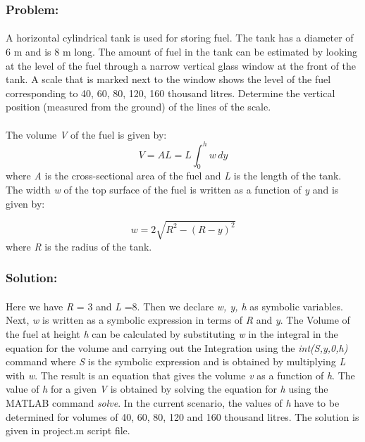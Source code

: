 \documentclass[]{article}
\begin{document}
\subsubsection{Problem:}
\paragraph{}
A horizontal cylindrical tank is used for storing fuel. The tank has a diameter of 6 m and is 8 m long. The amount of fuel in the tank can be estimated by looking at the level of the fuel through a narrow vertical glass window at the front of the tank. A scale that is marked next to the window shows the level of the fuel corresponding to 40, 60, 80, 120, 160 thousand litres. Determine the vertical position (measured from the ground) of the lines of the scale. 
\paragraph{}
The volume \emph{V} of the fuel is given by:
\[
V=AL=L\int_0^h w\, dy
\]
where \emph{A} is the cross-sectional area of the fuel and \emph{L} is the length of the tank. The width \emph{w} of the top surface of the fuel is written as a function of \emph{y} and is given by:

\[
w=2\sqrt{R^2-(R-y)^2}
\] 
where \emph{R} is the radius of the tank.
\subsubsection{Solution:}
\paragraph{}
Here we have \emph{R} = 3 and \emph{L} =8. Then we declare \emph{w, y, h} as symbolic variables. Next, \emph{w} is written as a symbolic expression in terms of \emph{R} and \emph{y}. The Volume of the fuel at height \emph{h} can be calculated by substituting \emph{w} in the integral in the equation for the volume and carrying out the Integration using the \emph{int(S,y,0,h)} command where \emph{S} is the symbolic expression and is obtained by multiplying \emph{L} with \emph{w}. The result is an equation that gives the volume \emph{v} as a function of \emph{h}. The value of \emph{h} for a given \emph{V} is obtained by solving the equation for \emph{h} using the MATLAB command \emph{solve}. In the current scenario, the values of \emph{h} have to be determined for volumes of 40, 60, 80, 120 and 160 thousand litres. The solution is given in project.m script file.
\end{document}
